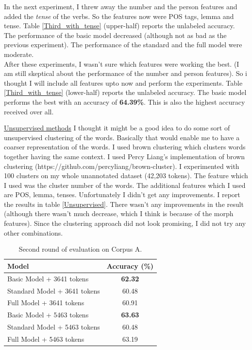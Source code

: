 \documentclass[11pt,letterpaper]{article}
\begin{document}
In the next experiment, I threw away the number and the person features and added the \textit{tense} of the verbs. So the features now were POS tags, lemma and tense. Table \ref{Third_with_tense} (upper-half) reports the unlabeled accuracy. The performance of the basic model decreased (although not as bad as the previous experiment). The performance of the standard and the full model were moderate.\\

After these experiments, I wasn't sure which features were working the best. (I am still skeptical about the performance of the number and person features). So i thought I will include all features upto now and perform the experiments. Table \ref{Third_with_tense} (lower-half) reports the unlabeled accuracy. The basic model performs the best with an accuracy of \textbf{64.39\%}. This is also the highest accuracy received over all.

\underline{Unsupervised methods} I thought it might be a good idea to do some sort of unsupervised clustering of the words. Basically that would enable me to have a coarser representation of the words. I used brown clustering \citep{Brown92class-basedn-gram} which clusters words together having the same context. I used Percy Liang's implementation of brown clustering (https://github.com/percyliang/brown-cluster). I experimented with 100 clusters on my whole unannotated dataset (42,203 tokens). The feature which I used was the cluster number of the words. The additional features which I used are POS, lemma, tenses.  Unfortunately I didn't get any improvements. I report the results in table \ref{Unsupervised}. There wasn't any improvements in the result (although there wasn't much decrease, which I think is because of the morph features). Since the clustering approach did not look promising, I did not try any other combinations.

\begin{table}
\begin{center}
  \begin{tabular}{ l || c }
  \hline
  Model & Accuracy (\%)\\
  \hline
  Basic Model + 3641 tokens & \textbf{62.32} \\
  Standard Model + 3641 tokens & 60.48 \\
  Full Model + 3641 tokens & 60.91 \\
  \hline
  Basic Model + 5463 tokens & \textbf{63.63} \\
  Standard Model + 5463 tokens & 60.48\\
  Full Model + 5463 tokens & 63.19\\
  \hline
   \end{tabular}
\end{center}
\caption{Second round of evaluation on Corpus A.}
\label{Second}
\end{table}
\end{document}
